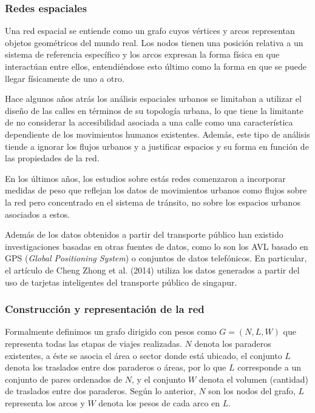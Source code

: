 \documentclass[12pt]{article}
\begin{document}
	\subsubsection{Redes espaciales} 
	
	Una red espacial se entiende como un grafo cuyos vértices y arcos representan objetos geométricos del mundo real. Los nodos tienen una posición relativa a un sistema de referencia específico y los arcos expresan la forma física en que interactúan entre ellos, entendiéndose esto último como la forma en que se puede llegar físicamente de uno a otro.
	
	
	Hace algunos años atrás los análisis espaciales urbanos se limitaban a utilizar el diseño de las calles en términos de su topología urbana, lo que tiene la limitante de no considerar la accesibilidad asociada a una calle como una característica dependiente de los movimientos humanos existentes. Además, este tipo de análisis tiende a ignorar los flujos urbanos y a justificar espacios y su forma en función de las propiedades de la red.
	
	En los últimos años, los estudios sobre estás redes comenzaron a incorporar medidas de peso que reflejan los datos de movimientos urbanos como flujos sobre la red pero concentrado en el sistema de tránsito, no sobre los espacios urbanos asociados a estos.
	
	Además de los datos obtenidos a partir del transporte público han existido investigaciones basadas en otras fuentes de datos, como lo son los AVL basado en GPS (\textit{Global Positioning System}) o conjuntos de datos telefónicos. En particular, el artículo de Cheng Zhong et al. (2014)  utiliza los datos generados a partir del uso de tarjetas inteligentes del transporte público de singapur.
    
    
    \subsubsection{Construcción y representación de la red} 
	
	Formalmente definimos un grafo dirigido con pesos como $G=(N,L,W)$ que representa todas las etapas de viajes realizadas. $N$ denota los paraderos existentes, a éste se asocia el área o sector donde está ubicado, el conjunto $L$ denota los traslados entre dos paraderos o áreas, por lo que $L$ corresponde a un conjunto de pares ordenados de $N$, y el conjunto $W$ denota el volumen (cantidad) de traslados entre dos paraderos. Según lo anterior, $N$ son los nodos del grafo, $L$ representa los arcos y $W$ denota los pesos de cada arco en $L$.
	
\end{document}
